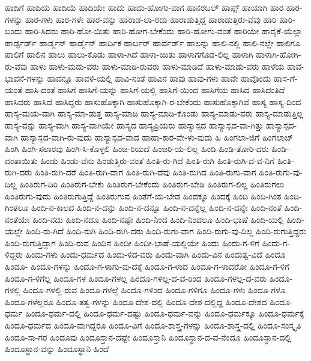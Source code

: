 {ಹಾದಿಗೆ
ಹಾದಿಯ
ಹಾದಿಯೆ
ಹಾದಿಯೇ
ಹಾದು
ಹಾದು-ಹೋಗು-ವಾಗ
ಹಾನರಬಲ್
ಹಾಪ್ಸ್
ಹಾಯಾಗಿ
ಹಾರ
ಹಾರ-ಗಳನ್ನು
ಹಾರ-ಗಳು
ಹಾರ-ಗಳೇ
ಹಾರ-ವನ್ನು
ಹಾರಾಡ-ಲಾ-ರದು
ಹಾರಾಡುತ್ತಿದ್ದ
ಹಾರಾಡುತ್ತಿರು-ವೆವು
ಹಾರಿ
ಹಾರಿ-ಬಂದು
ಹಾರಿ-ಸಿದರು
ಹಾರಿ-ಹೋ-ಯಿತು
ಹಾರಿ-ಹೋಗ-ಬೇಕೆಂದು
ಹಾರಿ-ಹೋಗು-ವಂತೆ
ಹಾರಿಯೇ
ಹಾರೈಕೆ-ಯೆಲ್ಲಾ
ಹಾರ್ಡ್ಫರ್ಡ್
ಹಾರ್ಡ್ಮನ್
ಹಾರ್ಡ್ಮೆನ್
ಹಾರ್ದಿಕ
ಹಾರ್ಬರ್
ಹಾರ್ವರ್ಡ್
ಹಾಲನ್ನು
ಹಾಲಿ-ನಲ್ಲಿ
ಹಾಲಿ-ನಲ್ಲೇ
ಹಾಲಿಗೂ
ಹಾಲಿಗೆ
ಹಾಲಿನ
ಹಾಲು
ಹಾಲು-ಕೊಡು
ಹಾಳಾ-ಗಿದೆ
ಹಾಳಾ-ಯಿತು
ಹಾಳಾಗಗೊಡ-ಲಿಲ್ಲ
ಹಾಳಾಗಿ
ಹಾಳಾಗಿ-ಹೋಗಿ-ರು-ವೆವು
ಹಾಳು
ಹಾಳು-ಮಡು-ವರು
ಹಾಳು-ಮಾಡಿ-ರುವರು
ಹಾಳು-ಮಾಡಿದೆ
ಹಾಳು-ಮಾಡು-ವರು
ಹಾಳೆಯ
ಹಾವ-ಭಾವನೆ-ಗಳನ್ನು
ಹಾವನ್ನೂ
ಹಾವಳಿ-ಯಲ್ಲಿ
ಹಾವಿ-ನಂತೆ
ಹಾವಿನ
ಹಾವು
ಹಾವು-ಗಳು
ಹಾವೇ
ಹಾವೊಂದು
ಹಾಸ-ಗೆ-ಯಂತೆ
ಹಾಸಿ-ದಂತೆ
ಹಾಸಿಗೆ
ಹಾಸಿಗೆ-ಯನ್ನು
ಹಾಸಿಗೆ-ಯಲ್ಲಿ
ಹಾಸಿಗೆ-ಯಿಂದ
ಹಾಸಿಗೆಯ
ಹಾಸಿದ
ಹಾಸಿದಂತಿದೆ
ಹಾಸಿದರು
ಹಾಸಿದೆ
ಹಾಸಿದ್ದರು
ಹಾಸುಹೊಕ್ಕಾಗಿ
ಹಾಸುಹೊಕ್ಕಾಗಿ-ರ-ಬೇಕೆಂದು
ಹಾಸುಹೊಕ್ಕಾಗಿವೆ
ಹಾಸ್ಯ
ಹಾಸ್ಯ-ದಿಂದ
ಹಾಸ್ಯ-ಮಯ-ವಾಗಿ
ಹಾಸ್ಯ-ಮಾ-ಡುತ್ತ
ಹಾಸ್ಯ-ಮಾಡಿ
ಹಾಸ್ಯ-ಮಾಡಿ-ಕೊಂಡು
ಹಾಸ್ಯ-ಮಾಡು-ವರು
ಹಾಸ್ಯ-ಮಾಡುತ್ತಿಲ್ಲ
ಹಾಸ್ಯ-ವನ್ನು
ಹಾಸ್ಯ-ವಾಗಿ
ಹಾಸ್ಯ-ವಾಗಿಯೇ
ಹಾಸ್ಯದ
ಹಾಸ್ಯಪ್ರಿಯರು
ಹಾಸ್ಯಾಸ್ಪದ
ಹಾಸ್ಯಾಸ್ಪದ-ವಾ-ಗಿತ್ತು
ಹಾಸ್ಯಾಸ್ಪದ-ವಾಗಿ
ಹಾಸ್ಯಾಸ್ಪದ-ವಾಗಿ-ರು-ವುದು
ಹಾಸ್ಯಾಸ್ಪದ-ವಾದ
ಹಾಹಾ-ಕಾರ-ವೇ-ಳು-ವುದು
ಹಿ
ಹಿಂಗಲಾ-ಜಿಗೆ
ಹಿಂಗಲಾಜ್
ಹಿಂಗಿ
ಹಿಂಗಿ-ಸಲಾರವು
ಹಿಂಗಿ-ಸಿ-ಕೊಳ್ಳಲಿ
ಹಿಂಜ-ರಿಯದೆ
ಹಿಂಜರಿ-ಯ-ಲಿಲ್ಲ
ಹಿಂಡಿ
ಹಿಂಡಿ-ತೋರಿ-ದರು
ಹಿಂಡಿ-ದಂತಾಯಿತು
ಹಿಂಡು
ಹಿಂಡು-ವೆನು
ಹಿಂಡುತ್ತಿರು-ವಂತೆ
ಹಿಂತಿ-ರು-ಗಿದೆ
ಹಿಂತಿ-ರುಗಿ
ಹಿಂತಿ-ರುಗಿ-ದ-ವ-ನಿಗೆ
ಹಿಂತಿ-ರುಗಿ-ದರು
ಹಿಂತಿ-ರುಗಿ-ದರೆ
ಹಿಂತಿ-ರುಗಿ-ದಾಗ
ಹಿಂತಿ-ರುಗಿ-ದೆವು
ಹಿಂತಿ-ರುಗಿದ
ಹಿಂತಿ-ರುಗು-ವಾಗ
ಹಿಂತಿ-ರುಗು-ವು-ದಿಲ್ಲ
ಹಿಂತಿರುಗ-ದಿರಿ
ಹಿಂತಿರುಗ-ಬೇಕು
ಹಿಂತಿರುಗ-ಬೇಕೆಂದು
ಹಿಂತಿರುಗ-ಬೇಡಿ
ಹಿಂತಿರುಗ-ಲಿಲ್ಲ
ಹಿಂತಿರುಗಲು
ಹಿಂತಿರುಗು-ವುದು
ಹಿಂತಿರುಗುತ್ತಿದ್ದೆ
ಹಿಂತಿರುಗುವ
ಹಿಂತೆಗೆ-ಯ-ಬೇಡ
ಹಿಂದಕ್ಕೂ
ಹಿಂದಕ್ಕೆ
ಹಿಂದಿ
ಹಿಂದಿ-ಗಿಂತ
ಹಿಂದಿ-ಗಿಂತಲೂ
ಹಿಂದಿ-ನ-ಕಾಲದ
ಹಿಂದಿ-ನ-ದನ್ನು
ಹಿಂದಿ-ನ-ದನ್ನೂ
ಹಿಂದಿ-ನ-ದನ್ನೆಲ್ಲ
ಹಿಂದಿ-ನ-ದನ್ನೇ
ಹಿಂದಿ-ನಂತೆ
ಹಿಂದಿ-ನಂತೆಯೇ
ಹಿಂದಿ-ನದು
ಹಿಂದಿ-ನದೂ
ಹಿಂದಿ-ನಷ್ಟೇ
ಹಿಂದಿ-ನಿಂದ
ಹಿಂದಿ-ನಿಂದಲೂ
ಹಿಂದಿ-ಭಾಷೆ
ಹಿಂದಿ-ಯಲ್ಲಿ
ಹಿಂದಿ-ಯಲ್ಲೇ
ಹಿಂದಿ-ರು-ಗಿದೆ
ಹಿಂದಿ-ರುಗಿ
ಹಿಂದಿ-ರುಗಿ-ದರು
ಹಿಂದಿ-ರುಗು-ವಾಗ
ಹಿಂದಿ-ರುಗು-ವು-ದಿಲ್ಲ
ಹಿಂದಿ-ರುಗುತ್ತಿದ್ದರು
ಹಿಂದಿ-ರುಗುತ್ತಿದ್ದಾಗ
ಹಿಂದಿ-ರುವ
ಹಿಂದಿನ
ಹಿಂದೀ
ಹಿಂದೀ-ಭಾಷೆ-ಯಲ್ಲಿಯೇ
ಹಿಂದು
ಹಿಂದು-ಗ-ಳಿಗೆ
ಹಿಂದು-ಗ-ಳಿದ್ದರು
ಹಿಂದು-ಗಳು
ಹಿಂದು-ಧರ್ಮದ
ಹಿಂದು-ಳಿದ-ವರು
ಹಿಂದು-ವಾಗಿ
ಹಿಂದು-ವಿನ
ಹಿಂದುತ್ವ-ವಿದೆ
ಹಿಂದೂ
ಹಿಂದೂ-
ಹಿಂದೂ-ಗಳನ್ನು
ಹಿಂದೂ-ಗ-ಳಾಗು-ವು-ದಕ್ಕೆ
ಹಿಂದೂ-ಗ-ಳಾದ
ಹಿಂದೂ-ಗ-ಳಾದರೋ
ಹಿಂದೂ-ಗ-ಳಿಗೆ
ಹಿಂದೂ-ಗ-ಳಿಗೆಲ್ಲ
ಹಿಂದೂ-ಗಳ
ಹಿಂದೂ-ಗಳಲ್ಲ
ಹಿಂದೂ-ಗಳಲ್ಲ-ದ-ವ-ರಿಂದ
ಹಿಂದೂ-ಗಳಲ್ಲ-ದ-ವರು
ಹಿಂದೂ-ಗಳಲ್ಲಿ
ಹಿಂದೂ-ಗಳಲ್ಲಿ-ರುವ
ಹಿಂದೂ-ಗಳಲ್ಲೆ
ಹಿಂದೂ-ಗಳಿಂದ
ಹಿಂದೂ-ಗಳಿಗೂ
ಹಿಂದೂ-ಗಳು
ಹಿಂದೂ-ಗಳೂ
ಹಿಂದೂ-ಗಳೆಲ್ಲರೂ
ಹಿಂದೂ-ತತ್ವ-ಗಳನ್ನು
ಹಿಂದೂ-ದೇಶ-ದಲ್ಲಿ
ಹಿಂದೂ-ದೇಶ-ದಲ್ಲಿದ್ದ
ಹಿಂದೂ-ದೇಶದ
ಹಿಂದೂ-ಧರ್ಮ
ಹಿಂದೂ-ಧರ್ಮ-ದಲ್ಲಿ
ಹಿಂದೂ-ಧರ್ಮ-ದಷ್ಟು
ಹಿಂದೂ-ಧರ್ಮ-ವನ್ನು
ಹಿಂದೂ-ಧರ್ಮಕ್ಕೂ
ಹಿಂದೂ-ಧರ್ಮಕ್ಕೆ
ಹಿಂದೂ-ಧರ್ಮದ
ಹಿಂದೂ-ವಾಗಿದ್ದರೂ
ಹಿಂದೂ-ವಿಗೆ
ಹಿಂದೂ-ಶಾಸ್ತ್ರ-ಗಳನ್ನು
ಹಿಂದೂ-ಶಾಸ್ತ್ರ-ದಲ್ಲಿ
ಹಿಂದೂ-ಸಂಸ್ಕೃತಿ
ಹಿಂದೂ-ಸಾ-ಗರ
ಹಿಂದೂವು
ಹಿಂದೂಸ್ತಾನ-ದಷ್ಟೇ
ಹಿಂದೂಸ್ತಾನಿ
ಹಿಂದೂಸ್ಥಾನ-ದ-ವ-ನೆಂದೂ
ಹಿಂದೂಸ್ಥಾನ-ದಲ್ಲಿ
ಹಿಂದೂಸ್ಥಾನ-ವನ್ನು
ಹಿಂದೂಸ್ಥಾನಿ
ಹಿಂದೆ
}

